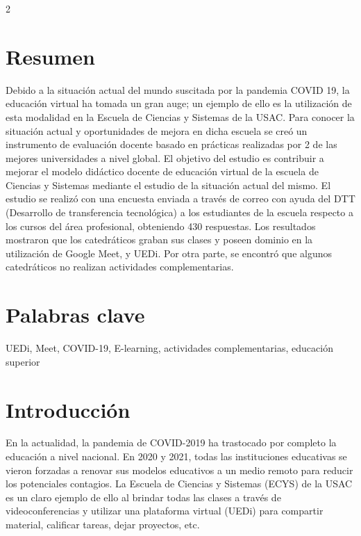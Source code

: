\documentclass[12pt,spanish,Letterpaper,openany]{book}
\begin{document}
\begin {multicols}{2}

\hypertarget{resumen-1}{%
\section{Resumen}\label{resumen-1}}

Debido a la situación actual del mundo suscitada por la pandemia COVID 19, la educación virtual ha tomada un gran auge; un ejemplo de ello es la utilización de esta modalidad en la Escuela de Ciencias y Sistemas de la USAC. Para conocer la situación actual y oportunidades de mejora en dicha escuela se creó un instrumento de evaluación docente basado en prácticas realizadas por 2 de las mejores universidades a nivel global. El objetivo del estudio es contribuir a mejorar el modelo didáctico docente de educación virtual de la escuela de Ciencias y Sistemas mediante el estudio de la situación actual del mismo. El estudio se realizó con una encuesta enviada a través de correo con ayuda del DTT (Desarrollo de transferencia tecnológica) a los estudiantes de la escuela respecto a los cursos del área profesional, obteniendo 430 respuestas. Los resultados mostraron que los catedráticos graban sus clases y poseen dominio en la utilización de Google Meet, y UEDi. Por otra parte, se encontró que algunos catedráticos no realizan actividades complementarias.

\hypertarget{palabras-clave-1}{%
\section{Palabras clave}\label{palabras-clave-1}}

UEDi, Meet, COVID-19, E-learning, actividades complementarias, educación superior

\hypertarget{introducciuxf3n-5}{%
\section{Introducción}\label{introducciuxf3n-5}}

En la actualidad, la pandemia de COVID-2019 ha trastocado por completo la educación a nivel nacional. En 2020 y 2021, todas las instituciones educativas se vieron forzadas a renovar sus modelos educativos a un medio remoto para reducir los potenciales contagios. La Escuela de Ciencias y Sistemas (ECYS) de la USAC es un claro ejemplo de ello al brindar todas las clases a través de videoconferencias y utilizar una plataforma virtual (UEDi) para compartir material, calificar tareas, dejar proyectos, etc.


\end{multicols}
\end{document}
